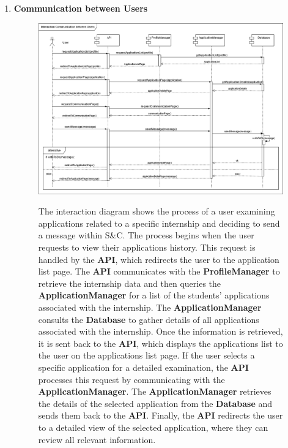 \begin{enumerate}
    \newpage
    \item \textbf{Communication between Users}
    \begin{figure}[h!]
            \centering  \includegraphics[width=1\textwidth]{DD/Images/Interactions/INT17_ CommunicationBetweenUsers.drawio.png}
            \label{fig:ComponentViewDiagram}
            \caption*{
            The interaction diagram shows the process of a user examining applications related to a specific internship and deciding to send a message within S\&C. The process begins when the user requests to view their applications history. This request is handled by the \textbf{API}, which redirects the user to the application list page. The \textbf{API} communicates with the \textbf{ProfileManager} to retrieve the internship data and then queries the \textbf{ApplicationManager} for a list of the students’ applications associated with the internship.
            The \textbf{ApplicationManager} consults the \textbf{Database} to gather details of all applications associated with the internship. 
            Once the information is retrieved, it is sent back to the \textbf{API}, which displays the applications list to the user on the applications list page.
            If the user selects a specific application for a detailed examination, the \textbf{API} processes this request by communicating with the \textbf{ApplicationManager}. The \textbf{ApplicationManager} retrieves the details of the selected application from the \textbf{Database} and sends them back to the \textbf{API}. 
            Finally, the \textbf{API} redirects the user to a detailed view of the selected application, where they can review all relevant information.
}
\end{figure}
\end{enumerate}

